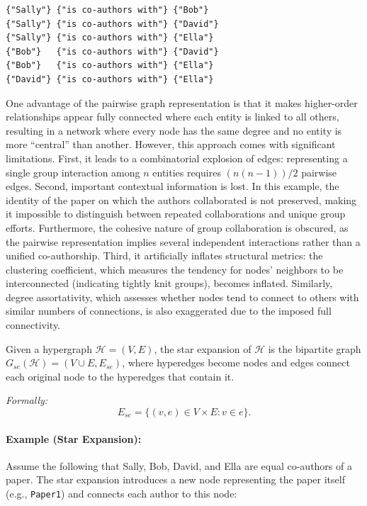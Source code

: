 \documentclass{article}
\begin{document}
\begin{verbatim}
{"Sally"} {"is co-authors with"} {"Bob"}
{"Sally"} {"is co-authors with"} {"David"}
{"Sally"} {"is co-authors with"} {"Ella"}
{"Bob"}   {"is co-authors with"} {"David"}
{"Bob"}   {"is co-authors with"} {"Ella"}
{"David"} {"is co-authors with"} {"Ella"}
\end{verbatim}

One advantage of the pairwise graph representation is that it makes higher-order relationships appear fully connected where each entity is linked to all others, resulting in a network where every node has the same degree and no entity is more ``central'' than another. However, this approach comes with significant limitations. First, it leads to a combinatorial explosion of edges: representing a single group interaction among \( n \) entities requires 
\( (n(n-1))/2 \) pairwise edges. Second, important contextual information is lost. In this example, the identity of the paper on which the authors collaborated is not preserved, making it impossible to distinguish between repeated collaborations and unique group efforts. Furthermore, the cohesive nature of group collaboration is obscured, as the pairwise representation implies several independent interactions rather than a unified co-authorship. Third, it artificially inflates structural metrics: the clustering coefficient, which measures the tendency for nodes' neighbors to be interconnected (indicating tightly knit groups), becomes inflated. Similarly, degree assortativity, which assesses whether nodes tend to connect to others with similar numbers of connections, is also exaggerated due to the imposed full connectivity.

\begin{mdframed}[linewidth=1pt, linecolor=black!60, backgroundcolor=gray!5]
\begin{defn}
Given a hypergraph $\mathcal{H} = (V, E)$, the star expansion of $\mathcal{H}$ is the bipartite graph $G_{se}(\mathcal{H}) = (V \cup E, E_{se})$, where hyperedges become nodes and edges connect each original node to the hyperedges that contain it.

\medskip

\noindent\textit{Formally:}
\[
E_{se} = \{ (v, e) \in V \times E : v \in e \}.
\]
\end{defn}
\end{mdframed}

\paragraph{Example (Star Expansion):} Assume the following that Sally, Bob, David, and Ella are equal co-authors of a paper. The star expansion introduces a new node representing the paper itself (e.g., \texttt{Paper1}) and connects each author to this node:
\end{document}
